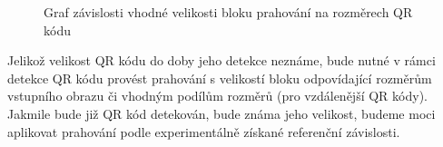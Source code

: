 \begin{figure}[H]
  \begin{center}
    \caption{Graf závislosti vhodné velikosti bloku prahování na rozměrech QR
    kódu}
    \label{DependencyOfSizeOfThresholdBlockToQRCodeSizes}
  \end{center}
\end{figure}

Jelikož velikost QR kódu do doby jeho detekce neznáme, bude nutné v rámci
detekce QR kódu provést prahování s velikostí bloku odpovídající rozměrům
vstupního obrazu či vhodným podílům rozměrů (pro vzdálenější QR kódy). Jakmile
bude již QR kód detekován, bude známa jeho velikost, budeme moci aplikovat
prahování podle experimentálně získané referenční závislosti.

